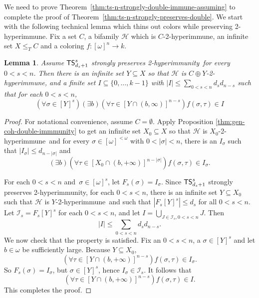 \documentclass{amsart}
\newtheorem{lemma}[theorem]{Lemma}
\theoremstyle{definition}
\theoremstyle{remark}
\numberwithin{equation}{section}
\theoremstyle{noparens}
\def\propertyL{2-hyperimmunity}
\def\hyper{2-hyperimmune}
\newcommand{\Hcal}{\mathcal{H}}
\newcommand{\Ical}{\mathcal{I}}
\newcommand{\s}[1]{\ensuremath{\sf{#1}}}
\DeclareMathOperator{\ts}{\s{TS}}
\begin{document}
We need to prove Theorem~\ref{thm:ts-n-strongly-double-immune-assuming} to complete the proof of
 Theorem~\ref{thm:ts-n-strongly-preserves-double}.
We start with the following technical lemma which thins out colors while
preserving \hyper.
Fix a set  $C$, a bifamily $\Hcal$
which is $C$-\hyper, an infinite set $X\leq_T C$ and a coloring $f : [\omega]^n \to k$.
\begin{lemma}\label{thm:gen-coh-art}
Assume $\ts^s_{d_s+1}$ strongly
preserves \propertyL\ for every  $0<s <n$.
Then there is an infinite set $Y\subseteq X$ so that $\Hcal$ is $C \oplus Y$-\hyper,
and a finite set $I \subseteq \{0, \dots, k-1\}$ with
$
|I| \leq \sum_{0 < s < n} d_s d_{n-s}
$
such that for each  $0<s <n$,
$$
(\forall \sigma \in [Y]^s)(\exists b)(\forall \tau \in [Y \cap (b, \infty)]^{n-s})f(\sigma, \tau) \in I
$$
\end{lemma}
\begin{proof}
For notational convenience, assume $C=\emptyset$.
Apply Proposition \ref{thm:gen-coh-double-immmunity}
to get an infinite set $X_0\subseteq X$
so that $\Hcal$
is $X_0  $-\hyper\ and for every $\sigma\in [\omega]^{<\omega}$
with $0<|\sigma|<n$,
there is an $I_\sigma$
such that  $|I_\sigma| \leq d_{n-|\sigma|}$ and
$$
(\exists b)(\forall \tau \in [X_0 \cap (b, +\infty)]^{n-|\sigma|}) f(\sigma, \tau) \in I_\sigma.
$$


For each  $0<s<n$
 and~$\sigma \in [\omega]^s$, let $F_s(\sigma) = I_\sigma$.
Since $\ts^s_{d_s+1}$ strongly preserves \propertyL,
  for each  $0<s<n$,
  there is an infinite set $Y\subseteq X_0$
  such that $\Hcal$ is $Y $-\hyper\ and
  such that $|F_s[Y]^s|\leq d_s$
  for all $0<s<n$.
  Let $\Ical_s = F_s[Y]^s$ for each  $0<s<n$, and let
$I = \bigcup_{J\in\Ical_s, 0 < s < n} J$.
Then
$$
|I| \leq \sum_{0 < s < n} d_s d_{n-s}.
$$
We now check that the property is satisfied.
Fix an $0<s<n$, a $\sigma \in [Y]^s$ and let $b\in\omega$ be sufficiently large. Because  $Y \subseteq X_0$,
$$
 (\forall \tau \in [Y \cap (b,+\infty)]^{n-s}) f(\sigma,\tau) \in I_\sigma.
$$
So $F_s(\sigma) = I_\sigma$, but $\sigma \in [Y]^s$, hence $I_\sigma \in \Ical_s$.
It follows that
$$
 (\forall \tau \in [Y \cap (b,+\infty)]^{n-s}) f(\sigma,\tau) \in I .
$$
 This completes the proof.
\end{proof}
\end{document}
